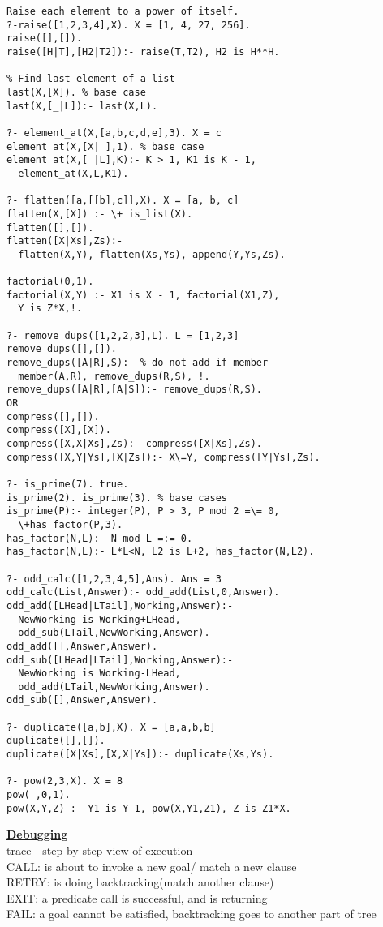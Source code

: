 \documentclass[8pt,letterpaper,twocolumn]{article}
\begin{document}
\begin{verbatim}
Raise each element to a power of itself.
?-raise([1,2,3,4],X). X = [1, 4, 27, 256].
raise([],[]).
raise([H|T],[H2|T2]):- raise(T,T2), H2 is H**H.

% Find last element of a list
last(X,[X]). % base case
last(X,[_|L]):- last(X,L).

?- element_at(X,[a,b,c,d,e],3). X = c
element_at(X,[X|_],1). % base case
element_at(X,[_|L],K):- K > 1, K1 is K - 1,
  element_at(X,L,K1).

?- flatten([a,[[b],c]],X). X = [a, b, c]
flatten(X,[X]) :- \+ is_list(X).
flatten([],[]).
flatten([X|Xs],Zs):-
  flatten(X,Y), flatten(Xs,Ys), append(Y,Ys,Zs).

factorial(0,1).
factorial(X,Y) :- X1 is X - 1, factorial(X1,Z),
  Y is Z*X,!.

?- remove_dups([1,2,2,3],L). L = [1,2,3]
remove_dups([],[]).
remove_dups([A|R],S):- % do not add if member
  member(A,R), remove_dups(R,S), !.
remove_dups([A|R],[A|S]):- remove_dups(R,S).
OR
compress([],[]).
compress([X],[X]).
compress([X,X|Xs],Zs):- compress([X|Xs],Zs).
compress([X,Y|Ys],[X|Zs]):- X\=Y, compress([Y|Ys],Zs).

?- is_prime(7). true.
is_prime(2). is_prime(3). % base cases
is_prime(P):- integer(P), P > 3, P mod 2 =\= 0,
  \+has_factor(P,3).
has_factor(N,L):- N mod L =:= 0.
has_factor(N,L):- L*L<N, L2 is L+2, has_factor(N,L2).

?- odd_calc([1,2,3,4,5],Ans). Ans = 3
odd_calc(List,Answer):- odd_add(List,0,Answer).
odd_add([LHead|LTail],Working,Answer):-
  NewWorking is Working+LHead,
  odd_sub(LTail,NewWorking,Answer).
odd_add([],Answer,Answer).
odd_sub([LHead|LTail],Working,Answer):-
  NewWorking is Working-LHead,
  odd_add(LTail,NewWorking,Answer).
odd_sub([],Answer,Answer).

?- duplicate([a,b],X). X = [a,a,b,b]
duplicate([],[]).
duplicate([X|Xs],[X,X|Ys]):- duplicate(Xs,Ys).

?- pow(2,3,X). X = 8
pow(_,0,1).
pow(X,Y,Z) :- Y1 is Y-1, pow(X,Y1,Z1), Z is Z1*X.
\end{verbatim}
\underline{\textbf{Debugging}}\\
trace - step-by-step view of execution\\
CALL: is about to invoke a new goal/ match a new clause\\
RETRY: is doing backtracking(match another clause)\\
EXIT: a predicate call is successful, and is returning\\
FAIL: a goal cannot be satisfied, backtracking goes to another part of tree
\end{document}
